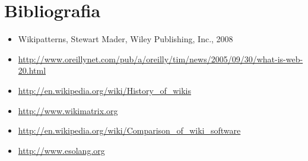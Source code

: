 \documentclass{article}
\begin{document}
\section{Bibliografia}
	\begin{itemize}
		\item 	Wikipatterns, Stewart Mader, Wiley Publishing, Inc., 2008
 		\item \url{http://www.oreillynet.com/pub/a/oreilly/tim/news/2005/09/30/what-is-web-20.html}
		\item \url{http://en.wikipedia.org/wiki/History_of_wikis}
		\item \url{http://www.wikimatrix.org}
		\item \url{http://en.wikipedia.org/wiki/Comparison_of_wiki_software}
		\item \url{http://www.esolang.org}
	\end{itemize}
\end{document}
